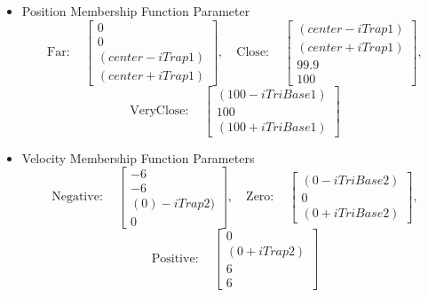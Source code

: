 \begin{itemize} \item Position Membership Function Parameter \begin{displaymath} \mathrm{Far:}\quad
\begin{bmatrix} 0\\0\\(center-iTrap1)\\(center+iTrap1) \end{bmatrix}, \quad
    \mathrm{Close:}\quad \begin{bmatrix} (center-iTrap1)\\(center+iTrap1)\\99.9\\100
\end{bmatrix}, \end{displaymath} \begin{displaymath} \mathrm{VeryClose:}\quad \begin{bmatrix}
(100-iTriBase1)\\100\\ (100+iTriBase1) \end{bmatrix} \end{displaymath}
 
 \item Velocity Membership Function Parameters \begin{displaymath} \mathrm{Negative:}\quad
     \begin{bmatrix} -6\\-6\\(0)-iTrap2)\\0 \end{bmatrix}, \quad \mathrm{Zero:}\quad
     \begin{bmatrix} (0-iTriBase2)\\0\\ (0+iTriBase2) \end{bmatrix}, \end{displaymath}
         \begin{displaymath} \mathrm{Positive:}\quad \begin{bmatrix} 0\\ (0+iTrap2)\\6\\6
         \end{bmatrix} \end{displaymath}
 

\end{itemize}
